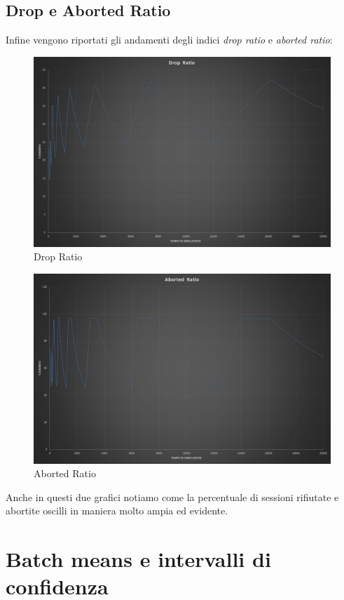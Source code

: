 \subsection{Drop e Aborted Ratio}
Infine vengono riportati gli andamenti degli indici \textit{drop ratio} e 
\textit{aborted ratio}:
\begin{figure}[H]
 \centering
 \includegraphics[scale=0.4]{img/dropRatio.png}
 \caption[Drop Ratio]{Drop Ratio}
 \label{fig:Drop Ratio}
\end{figure}
\begin{figure}[H]
 \centering
 \includegraphics[scale=0.4]{img/abortRatio.png}
 \caption[Aborted Ratio]{Aborted Ratio}
 \label{fig:Aborted Ratio}
\end{figure}
Anche in questi due grafici notiamo come la percentuale di sessioni rifiutate e 
abortite oscilli in maniera molto ampia ed evidente.

\section{Batch means e intervalli di confidenza}


